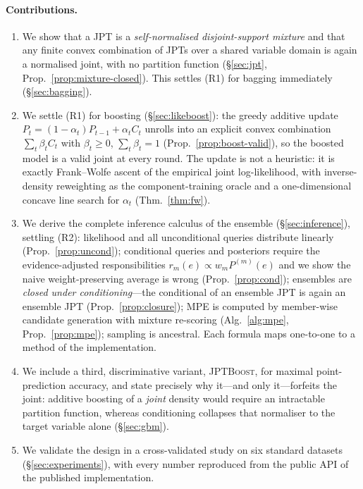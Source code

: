 \documentclass[11pt]{article}
\theoremstyle{plain}
\theoremstyle{definition}
\theoremstyle{remark}
\newcommand{\jptboost}{\textsc{JPTBoost}}
\begin{document}
\paragraph{Contributions.}
\begin{enumerate}[leftmargin=1.6em]
\item We show that a JPT is a \emph{self-normalised disjoint-support
mixture} and that any finite convex combination of JPTs over a shared
variable domain is again a normalised joint, with no partition function
(\S\ref{sec:jpt}, Prop.~\ref{prop:mixture-closed}). This settles (R1) for
bagging immediately (\S\ref{sec:bagging}).
\item We settle (R1) for boosting (\S\ref{sec:likeboost}): the greedy
additive update $P_t=(1-\alpha_t)P_{t-1}+\alpha_t C_t$ unrolls into an
explicit convex combination $\sum_t\beta_t C_t$ with $\beta_t\ge0$,
$\sum_t\beta_t=1$ (Prop.~\ref{prop:boost-valid}), so the boosted model is
a valid joint at every round. The update is not a heuristic: it is exactly
Frank--Wolfe ascent of the empirical joint log-likelihood, with
inverse-density reweighting as the component-training oracle and a
one-dimensional concave line search for $\alpha_t$ (Thm.~\ref{thm:fw}).
\item We derive the complete inference calculus of the ensemble
(\S\ref{sec:inference}), settling (R2): likelihood and all unconditional
queries distribute linearly (Prop.~\ref{prop:uncond}); conditional
queries and posteriors require the evidence-adjusted responsibilities
$r_m(e)\propto w_m P^{(m)}(e)$ and we show the naive weight-preserving
average is wrong (Prop.~\ref{prop:cond}); ensembles are \emph{closed
under conditioning}---the conditional of an ensemble JPT is again an
ensemble JPT (Prop.~\ref{prop:closure}); MPE is computed by member-wise
candidate generation with mixture re-scoring
(Alg.~\ref{alg:mpe}, Prop.~\ref{prop:mpe}); sampling is ancestral. Each
formula maps one-to-one to a method of the implementation.
\item We include a third, discriminative variant, \jptboost{}, for
maximal point-prediction accuracy, and state precisely why it---and only
it---forfeits the joint: additive boosting of a \emph{joint} density
would require an intractable partition function, whereas conditioning
collapses that normaliser to the target variable alone
(\S\ref{sec:gbm}).
\item We validate the design in a cross-validated study on six standard
datasets (\S\ref{sec:experiments}), with every number reproduced from
the public API of the published implementation.
\end{enumerate}
\end{document}
